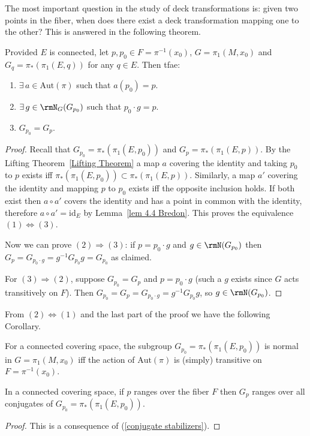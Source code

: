 The most important question in the study of deck transformations is: given two points in the fiber, when does there exist a deck transformation mapping one to the other? This is answered in the following theorem.
\begin{thm}\label{thm 6.3 Bredon}
    Provided $E$ is connected, let $p,p_0\in F=\pi^{-1}(x_0)$, $G=\pi_1(M,x_0)$ and $G_{q}=\pi_\ast(\pi_1(E,q))$ for any $q\in E$. Then \gls{tfae}:
    \begin{enumerate}
        \item $\exists\, a\in \mathrm{Aut}(\pi)$ such that $a(p_0)=p$.
        \item $\exists\, g\in \rmN_G(G_{p_0})$ such that $p_0\cdot g=p$.
        \item $G_{p_0}=G_p$.
    \end{enumerate}
\end{thm}
\begin{proof}
    Recall that $G_{p_0}=\pi_\ast(\pi_1(E,p_0))$ and $G_{p}=\pi_\ast(\pi_1(E,p))$. By the Lifting Theorem~\ref{Lifting Theorem} a map $a$ covering the identity and taking $p_0$ to $p$ exists iff $\pi_\ast(\pi_1(E,p_0))\subset \pi_\ast(\pi_1(E,p))$. Similarly, a map $a'$ covering the identity and mapping $p$ to $p_0$ exists iff the opposite inclusion holds. If both exist then $a\circ a'$ covers the identity and has a point in common with the identity, therefore $a\circ a'=\mathrm{id}_E$ by Lemma~\ref{lem 4.4 Bredon}. This proves the equivalence $(1)\Leftrightarrow (3)$.

    Now we can prove $(2)\Rightarrow(3)$: if $p=p_0\cdot g$ and $g\in \rmN(G_{p_0})$ then $G_p=G_{p_0\cdot g}=g^{-1}G_{p_0}g=G_{p_0}$ as claimed.

    For $(3)\Rightarrow (2)$, suppose $G_{p_0}=G_p$ and $p=p_0\cdot g$ (such a $g$ exists since $G$ acts transitively on $F$). Then $G_{p_0}=G_p=G_{p_0\cdot g}=g^{-1}G_{p_0}g$, so $g\in \rmN(G_{p_0})$.
\end{proof}
From $(2)\Leftrightarrow(1)$ and the last part of the proof we have the following Corollary.
\begin{cor}\label{cor 6.4 Bredon}
    For a connected covering space, the subgroup $G_{p_0}=\pi_\ast(\pi_1(E,p_0))$ is normal in $G=\pi_1(M,x_0)$ iff the action of $\mathrm{Aut}(\pi)$ is (simply) transitive on $F=\pi^{-1}(x_0)$.
\end{cor}
\begin{cor}\label{cor 6.5 Bredon}
    In a connected covering space, if $p$ ranges over the fiber $F$ then $G_p$ ranges over all conjugates of $G_{p_0}=\pi_\ast(\pi_1(E,p_0))$.
\end{cor}
\begin{proof}
    This is a consequence of (\ref{conjugate stabilizers}).
\end{proof}

